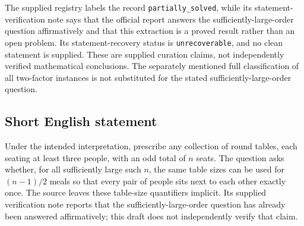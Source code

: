 \documentclass[11pt]{article}
\begin{document}
The supplied registry labels the record \texttt{partially\_solved}, while its statement-verification note says that the official report answers the sufficiently-large-order question affirmatively and that this extraction is a proved result rather than an open problem. Its statement-recovery status is \texttt{unrecoverable}, and no clean statement is supplied. These are supplied curation claims, not independently verified mathematical conclusions. The separately mentioned full classification of all two-factor instances is not substituted for the stated sufficiently-large-order question.
\subsection{Short English statement}
Under the intended interpretation, prescribe any collection of round tables, each seating at least three people, with an odd total of \(n\) seats. The question asks whether, for all sufficiently large such \(n\), the same table sizes can be used for \((n-1)/2\) meals so that every pair of people sits next to each other exactly once. The source leaves these table-size quantifiers implicit. Its supplied verification note reports that the sufficiently-large-order question has already been answered affirmatively; this draft does not independently verify that claim.
\end{document}
